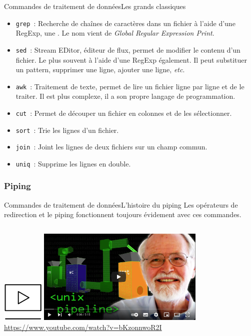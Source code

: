 \documentclass{beamer}
\begin{document}
    \begin{frame}{Commandes de traitement de données}{Les grands classiques}
        \begin{itemize}
            \item \lstinline{grep}~: Recherche de chaînes de caractères dans un fichier à l'aide d'une RegExp, une .
            Le nom vient de \textit{Global Regular Expression Print}.
            \item \lstinline{sed}~: Stream EDitor, éditeur de flux, permet de modifier le contenu d'un fichier.
            Le plus souvent à l'aide d'une RegExp également.
            Il peut substituer un pattern, supprimer une ligne, ajouter une ligne, \textit{etc}.
            \item \lstinline{awk}~: Traitement de texte, permet de lire un fichier ligne par ligne et de le traiter.
            Il est plus complexe, il a son propre langage de programmation.
            \item \lstinline{cut}~: Permet de découper un fichier en colonnes et de les sélectionner.
            \item \lstinline{sort}~: Trie les lignes d'un fichier.
            \item \lstinline{join}~: Joint les lignes de deux fichiers sur un champ commun.
            \item \lstinline{uniq}~: Supprime les lignes en double.
        \end{itemize}
    \end{frame}

    \subsubsection{Piping}\label{subsubsec:piping}
    \begin{frame}{Commandes de traitement de données}{L'histoire du piping}
        Les opérateurs de redirection et le piping fonctionnent toujours évidement avec ces commandes.
        \bigbreak
        \begin{columns}
            \centering
            \includegraphics[width=2cm]{image/video}
            \includegraphics[width=8cm]{image/kernighan-piping-video} \\ \url{https://www.youtube.com/watch?v=bKzonnwoR2I} \\
        \end{columns}
    \end{frame}
\end{document}
